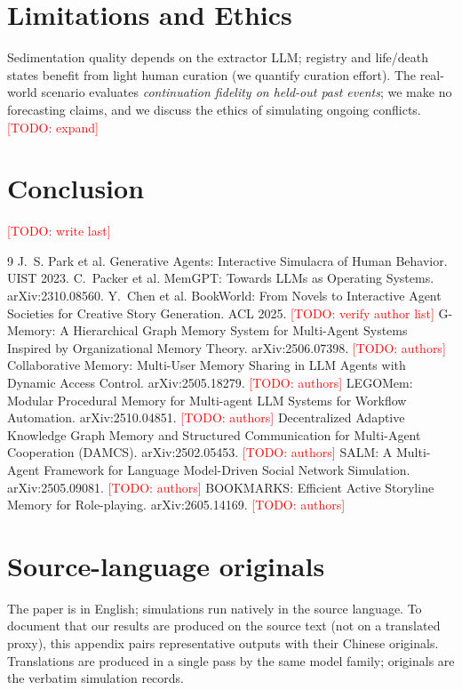 \documentclass[11pt]{article}
\newcommand{\todo}[1]{\textcolor{red}{[TODO: #1]}}
\begin{document}
\section{Limitations and Ethics}
\label{sec:limitations}
Sedimentation quality depends on the extractor LLM; registry and life/death
states benefit from light human curation (we quantify curation effort).
The real-world scenario evaluates \emph{continuation fidelity on held-out past
events}; we make no forecasting claims, and we discuss the ethics of simulating
ongoing conflicts. \todo{expand}

\section{Conclusion}
\todo{write last}


\begin{thebibliography}{9}
 J.~S. Park et al. Generative Agents: Interactive
Simulacra of Human Behavior. UIST 2023.
 C.~Packer et al. MemGPT: Towards LLMs as Operating
Systems. arXiv:2310.08560.
 Y.~Chen et al. BookWorld: From Novels to
Interactive Agent Societies for Creative Story Generation. ACL 2025.
\todo{verify author list}
 G-Memory: A Hierarchical Graph Memory System for
Multi-Agent Systems Inspired by Organizational Memory Theory.
arXiv:2506.07398. \todo{authors}
 Collaborative Memory: Multi-User Memory Sharing in
LLM Agents with Dynamic Access Control. arXiv:2505.18279. \todo{authors}
 LEGOMem: Modular Procedural Memory for Multi-agent LLM
Systems for Workflow Automation. arXiv:2510.04851. \todo{authors}
 Decentralized Adaptive Knowledge Graph Memory and
Structured Communication for Multi-Agent Cooperation (DAMCS).
arXiv:2502.05453. \todo{authors}
 SALM: A Multi-Agent Framework for Language Model-Driven
Social Network Simulation. arXiv:2505.09081. \todo{authors}
 BOOKMARKS: Efficient Active Storyline Memory for
Role-playing. arXiv:2605.14169. \todo{authors}
\end{thebibliography}

\appendix

\section{Source-language originals}
\label{app:examples}
The paper is in English; simulations run natively in the source language.
To document that our results are produced on the source text (not on a
translated proxy), this appendix pairs representative outputs with their
Chinese originals. Translations are produced in a single pass by the same
model family; originals are the verbatim simulation records.
\end{document}

